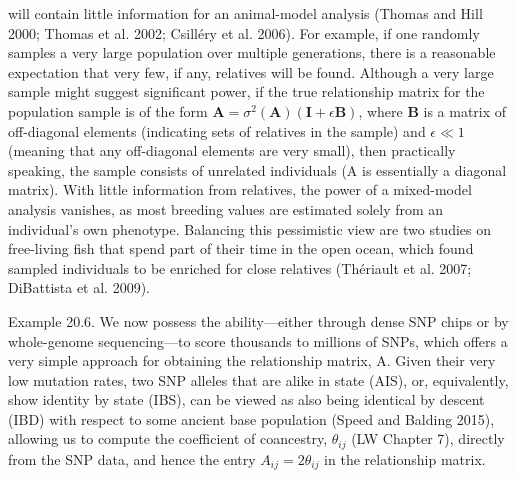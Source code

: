 \documentclass{article}
\begin{document}
will contain little information for an animal-model analysis (Thomas and Hill 2000; Thomas et al. 2002; Csilléry et al. 2006). For example, if one randomly samples a very large population over multiple generations, there is a reasonable expectation that very few, if any, relatives will be found. Although a very large sample might suggest significant power, if the true relationship matrix for the population sample is of the form  $ \mathbf{A} = \sigma^2(\mathbf{A})(\mathbf{I} + \epsilon\mathbf{B}) $, where  $ \mathbf{B} $ is a matrix of off-diagonal elements (indicating sets of relatives in the sample) and  $ \epsilon \ll 1 $ (meaning that any off-diagonal elements are very small), then practically speaking, the sample consists of unrelated individuals (A is essentially a diagonal matrix). With little information from relatives, the power of a mixed-model analysis vanishes, as most breeding values are estimated solely from an individual's own phenotype. Balancing this pessimistic view are two studies on free-living fish that spend part of their time in the open ocean, which found sampled individuals to be enriched for close relatives (Thériault et al. 2007; DiBattista et al. 2009).

Example 20.6. We now possess the ability—either through dense SNP chips or by whole-genome sequencing—to score thousands to millions of SNPs, which offers a very simple approach for obtaining the relationship matrix, A. Given their very low mutation rates, two SNP alleles that are alike in state (AIS), or, equivalently, show identity by state (IBS), can be viewed as also being identical by descent (IBD) with respect to some ancient base population (Speed and Balding 2015), allowing us to compute the coefficient of coancestry,  $ \theta_{ij} $ (LW Chapter 7), directly from the SNP data, and hence the entry  $ A_{ij} = 2\theta_{ij} $ in the relationship matrix.
\end{document}

